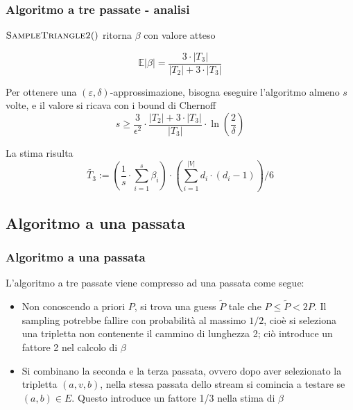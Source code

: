 \documentclass{beamer}
\begin{document}
\begin{frame}
\frametitle{Algoritmo a tre passate - analisi}

$\Call{SampleTriangle2}{ }$ ritorna $\beta$ con valore atteso

\[
    \mathbb{E}|\beta|=\frac{3 \cdot\left|T_{3}\right|}{\left|T_{2}\right|+3 \cdot\left|T_{3}\right|}
\]

Per ottenere una $(\varepsilon, \delta)$-approssimazione, bisogna eseguire l'algoritmo almeno $s$ volte, e il valore si ricava con i bound di Chernoff
\[
    s \geq \frac{3}{\epsilon^{2}} \cdot \frac{\left|T_{2}\right|+3 \cdot\left|T_{3}\right|}{\left|T_{3}\right|} \cdot \ln \left(\frac{2}{\delta}\right)
\]

La stima risulta
\[
    \widetilde{T_{3}}:=\left(\frac{1}{s} \cdot \sum_{i=1}^{s} \beta_{i}\right) \cdot\left(\sum_{i=1}^{|V|} d_{i} \cdot\left(d_{i}-1\right)\right) / 6
\]

\end{frame}

\subsection{Algoritmo a una passata}

\begin{frame}
\frametitle{Algoritmo a una passata}

L’algoritmo a tre passate viene compresso ad una passata come segue:
\begin{itemize}
    \item Non conoscendo a priori $P$, si trova una guess $\widetilde{P}$ tale che $P \leq \widetilde{P} < 2P$.
        Il sampling potrebbe fallire con probabilità al massimo $1/2$, cioè si seleziona una tripletta non contenente il cammino di lunghezza 2; ciò introduce un fattore 2 nel calcolo di $\beta$
    \item Si combinano la seconda e la terza passata, ovvero dopo aver selezionato la tripletta $(a, v, b)$, nella stessa passata dello stream si comincia a testare se $(a, b) \in E$. Questo introduce un fattore 1/3 nella stima di $\beta$
\end{itemize}

\end{frame}
\end{document}
